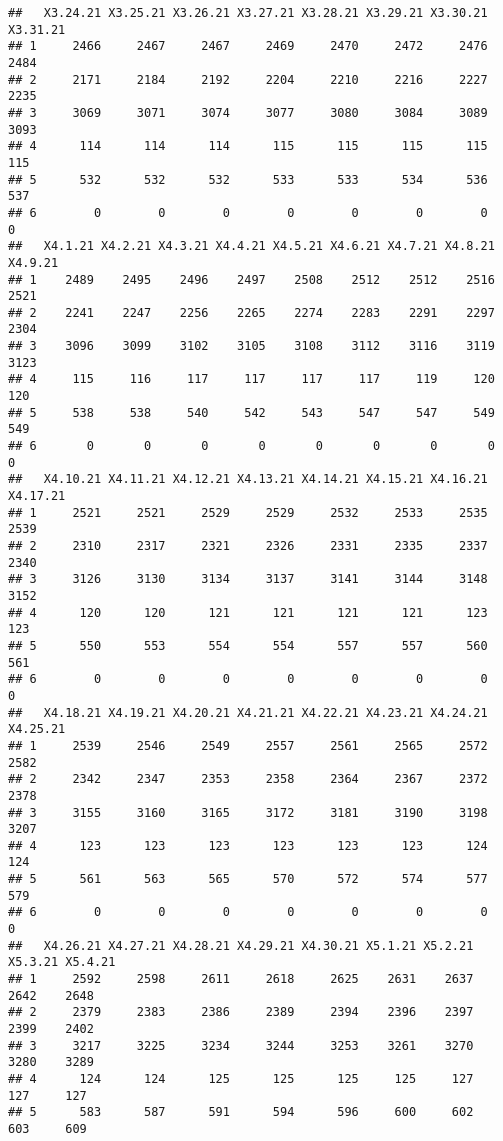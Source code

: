 \documentclass[
]{article}
\begin{document}
\begin{verbatim}
##   X3.24.21 X3.25.21 X3.26.21 X3.27.21 X3.28.21 X3.29.21 X3.30.21 X3.31.21
## 1     2466     2467     2467     2469     2470     2472     2476     2484
## 2     2171     2184     2192     2204     2210     2216     2227     2235
## 3     3069     3071     3074     3077     3080     3084     3089     3093
## 4      114      114      114      115      115      115      115      115
## 5      532      532      532      533      533      534      536      537
## 6        0        0        0        0        0        0        0        0
##   X4.1.21 X4.2.21 X4.3.21 X4.4.21 X4.5.21 X4.6.21 X4.7.21 X4.8.21 X4.9.21
## 1    2489    2495    2496    2497    2508    2512    2512    2516    2521
## 2    2241    2247    2256    2265    2274    2283    2291    2297    2304
## 3    3096    3099    3102    3105    3108    3112    3116    3119    3123
## 4     115     116     117     117     117     117     119     120     120
## 5     538     538     540     542     543     547     547     549     549
## 6       0       0       0       0       0       0       0       0       0
##   X4.10.21 X4.11.21 X4.12.21 X4.13.21 X4.14.21 X4.15.21 X4.16.21 X4.17.21
## 1     2521     2521     2529     2529     2532     2533     2535     2539
## 2     2310     2317     2321     2326     2331     2335     2337     2340
## 3     3126     3130     3134     3137     3141     3144     3148     3152
## 4      120      120      121      121      121      121      123      123
## 5      550      553      554      554      557      557      560      561
## 6        0        0        0        0        0        0        0        0
##   X4.18.21 X4.19.21 X4.20.21 X4.21.21 X4.22.21 X4.23.21 X4.24.21 X4.25.21
## 1     2539     2546     2549     2557     2561     2565     2572     2582
## 2     2342     2347     2353     2358     2364     2367     2372     2378
## 3     3155     3160     3165     3172     3181     3190     3198     3207
## 4      123      123      123      123      123      123      124      124
## 5      561      563      565      570      572      574      577      579
## 6        0        0        0        0        0        0        0        0
##   X4.26.21 X4.27.21 X4.28.21 X4.29.21 X4.30.21 X5.1.21 X5.2.21 X5.3.21 X5.4.21
## 1     2592     2598     2611     2618     2625    2631    2637    2642    2648
## 2     2379     2383     2386     2389     2394    2396    2397    2399    2402
## 3     3217     3225     3234     3244     3253    3261    3270    3280    3289
## 4      124      124      125      125      125     125     127     127     127
## 5      583      587      591      594      596     600     602     603     609

\end{verbatim}
\end{document}
